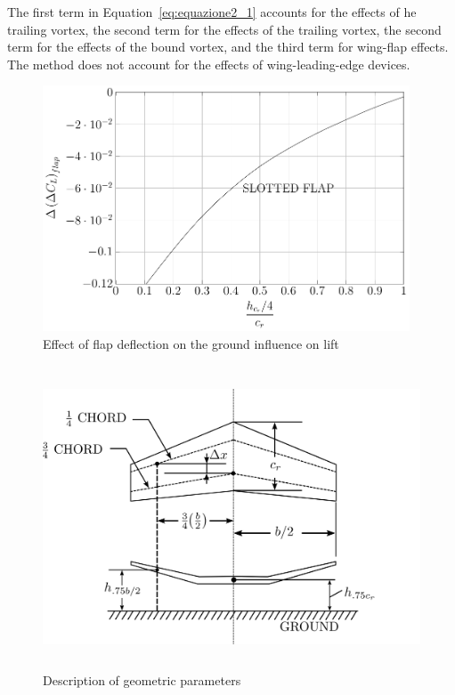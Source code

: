The first term in Equation~\ref{eq:equazione2_1} accounts for the effects of he trailing vortex, the second term for the effects of the trailing vortex, the second term for the effects of the bound vortex, and the third term for wing-flap effects. The method does not account for the effects of wing-leading-edge devices.\\
\begin{figure}[H]
	\centering
	\includegraphics[height=7.3cm, keepaspectratio ]{Immagini/Capitolo2/2_4-Delta_alpha_CL_Ground_Effect_DeltaDelta_CL_flap_vs_h_cr_4_cr} 
	\caption{Effect of flap deflection on the ground influence on lift} %
	\label{fig:figura2_4} %
\end{figure}

\begin{figure}[H]
	\centering
	\includegraphics[height=9cm, keepaspectratio ]{Immagini/Capitolo2/disegno-1} 
	\caption{Description of geometric parameters} %
	\label{fig:figura2_5} %
\end{figure}

